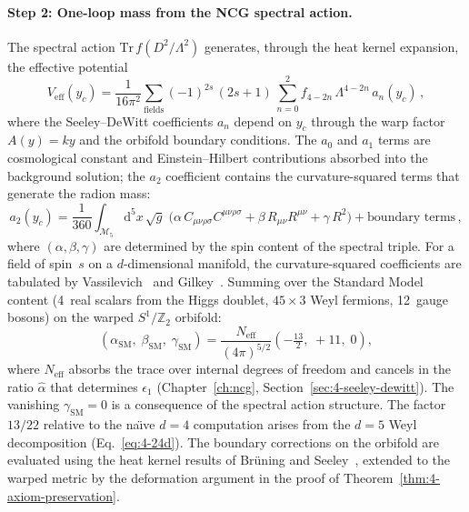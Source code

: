 \paragraph{Step 2: One-loop mass from the NCG spectral action.}
The spectral action $\mathrm{Tr}\,f(D^2/\Lambda^2)$ generates, through the heat kernel expansion, the effective potential
\begin{equation}
  V_{\mathrm{eff}}(y_c) = \frac{1}{16\pi^2}\sum_{\mathrm{fields}} (-1)^{2s}\,(2s+1)\,\sum_{n=0}^{2} f_{4-2n}\,\Lambda^{4-2n}\,a_n(y_c)\,,
  \label{eq:app-spectral-veff}
\end{equation}
where the Seeley--DeWitt coefficients $a_n$ depend on $y_c$ through the warp factor $A(y) = ky$ and the orbifold boundary conditions.  The $a_0$ and $a_1$ terms are cosmological constant and Einstein--Hilbert contributions absorbed into the background solution; the $a_2$ coefficient contains the curvature-squared terms that generate the radion mass:
\begin{equation}
  a_2(y_c) = \frac{1}{360}\int_{\mathcal{M}_5} \mathrm{d}^5x\,\sqrt{g}\;\bigl(
    \alpha\,C_{\mu\nu\rho\sigma}C^{\mu\nu\rho\sigma}
    + \beta\,R_{\mu\nu}R^{\mu\nu}
    + \gamma\,R^2
  \bigr) + \text{boundary terms}\,,
\end{equation}
where $(\alpha, \beta, \gamma)$ are determined by the spin content of the spectral triple.  For a field of spin~$s$ on a $d$-dimensional manifold, the curvature-squared coefficients are tabulated by Vassilevich~\cite{ch4:Vassilevich2003} and Gilkey~\cite{ch4:Gilkey1984}.  Summing over the Standard Model content (4~real scalars from the Higgs doublet, $45 \times 3$ Weyl fermions, 12~gauge bosons) on the warped $S^1/\mathbb{Z}_2$ orbifold:
\begin{equation}
  (\alpha_{\mathrm{SM}},\; \beta_{\mathrm{SM}},\; \gamma_{\mathrm{SM}})
  = \frac{N_{\mathrm{eff}}}{(4\pi)^{5/2}}
    \left( -\tfrac{13}{2},\; +11,\; 0 \right),
  \label{eq:app-sdw-coeffs}
\end{equation}
where $N_{\mathrm{eff}}$ absorbs the trace over internal degrees of freedom and cancels in the ratio $\hat{\alpha}$ that determines $\epsilon_1$ (Chapter~\ref{ch:ncg}, Section~\ref{sec:4-seeley-dewitt}).  The vanishing $\gamma_{\mathrm{SM}} = 0$ is a consequence of the spectral action structure.  The factor $13/22$ relative to the na\"{\i}ve $d = 4$ computation arises from the $d = 5$ Weyl decomposition (Eq.~\eqref{eq:4-24d}).  The boundary corrections on the orbifold are evaluated using the heat kernel results of Br\"uning and Seeley~\cite{ch4:bruning2001}, extended to the warped metric by the deformation argument in the proof of Theorem~\ref{thm:4-axiom-preservation}.

